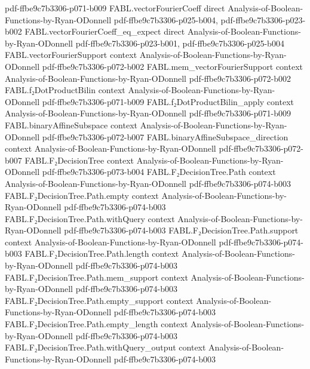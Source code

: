 \begin{theorem}
  {pdf-ffbe9c7b3306-p071-b009}
\proofstep
  {FABL.vectorFourierCoeff}
  {direct}
  {Analysis-of-Boolean-Functions-by-Ryan-ODonnell}
  {pdf-ffbe9c7b3306-p025-b004,
    pdf-ffbe9c7b3306-p023-b002}
\proofstep
  {FABL.vectorFourierCoeff_eq_expect}
  {direct}
  {Analysis-of-Boolean-Functions-by-Ryan-ODonnell}
  {pdf-ffbe9c7b3306-p023-b001,
    pdf-ffbe9c7b3306-p025-b004}
\proofstep
  {FABL.vectorFourierSupport}
  {context}
  {Analysis-of-Boolean-Functions-by-Ryan-ODonnell}
  {pdf-ffbe9c7b3306-p072-b002}
\proofstep
  {FABL.mem_vectorFourierSupport}
  {context}
  {Analysis-of-Boolean-Functions-by-Ryan-ODonnell}
  {pdf-ffbe9c7b3306-p072-b002}
\proofstep
  {FABL.f₂DotProductBilin}
  {context}
  {Analysis-of-Boolean-Functions-by-Ryan-ODonnell}
  {pdf-ffbe9c7b3306-p071-b009}
\proofstep
  {FABL.f₂DotProductBilin_apply}
  {context}
  {Analysis-of-Boolean-Functions-by-Ryan-ODonnell}
  {pdf-ffbe9c7b3306-p071-b009}
\proofstep
  {FABL.binaryAffineSubspace}
  {context}
  {Analysis-of-Boolean-Functions-by-Ryan-ODonnell}
  {pdf-ffbe9c7b3306-p072-b007}
\proofstep
  {FABL.binaryAffineSubspace_direction}
  {context}
  {Analysis-of-Boolean-Functions-by-Ryan-ODonnell}
  {pdf-ffbe9c7b3306-p072-b007}
\proofstep
  {FABL.F₂DecisionTree}
  {context}
  {Analysis-of-Boolean-Functions-by-Ryan-ODonnell}
  {pdf-ffbe9c7b3306-p073-b004}
\proofstep
  {FABL.F₂DecisionTree.Path}
  {context}
  {Analysis-of-Boolean-Functions-by-Ryan-ODonnell}
  {pdf-ffbe9c7b3306-p074-b003}
\proofstep
  {FABL.F₂DecisionTree.Path.empty}
  {context}
  {Analysis-of-Boolean-Functions-by-Ryan-ODonnell}
  {pdf-ffbe9c7b3306-p074-b003}
\proofstep
  {FABL.F₂DecisionTree.Path.withQuery}
  {context}
  {Analysis-of-Boolean-Functions-by-Ryan-ODonnell}
  {pdf-ffbe9c7b3306-p074-b003}
\proofstep
  {FABL.F₂DecisionTree.Path.support}
  {context}
  {Analysis-of-Boolean-Functions-by-Ryan-ODonnell}
  {pdf-ffbe9c7b3306-p074-b003}
\proofstep
  {FABL.F₂DecisionTree.Path.length}
  {context}
  {Analysis-of-Boolean-Functions-by-Ryan-ODonnell}
  {pdf-ffbe9c7b3306-p074-b003}
\proofstep
  {FABL.F₂DecisionTree.Path.mem_support}
  {context}
  {Analysis-of-Boolean-Functions-by-Ryan-ODonnell}
  {pdf-ffbe9c7b3306-p074-b003}
\proofstep
  {FABL.F₂DecisionTree.Path.empty_support}
  {context}
  {Analysis-of-Boolean-Functions-by-Ryan-ODonnell}
  {pdf-ffbe9c7b3306-p074-b003}
\proofstep
  {FABL.F₂DecisionTree.Path.empty_length}
  {context}
  {Analysis-of-Boolean-Functions-by-Ryan-ODonnell}
  {pdf-ffbe9c7b3306-p074-b003}
\proofstep
  {FABL.F₂DecisionTree.Path.withQuery_output}
  {context}
  {Analysis-of-Boolean-Functions-by-Ryan-ODonnell}
  {pdf-ffbe9c7b3306-p074-b003}

\end{theorem}
